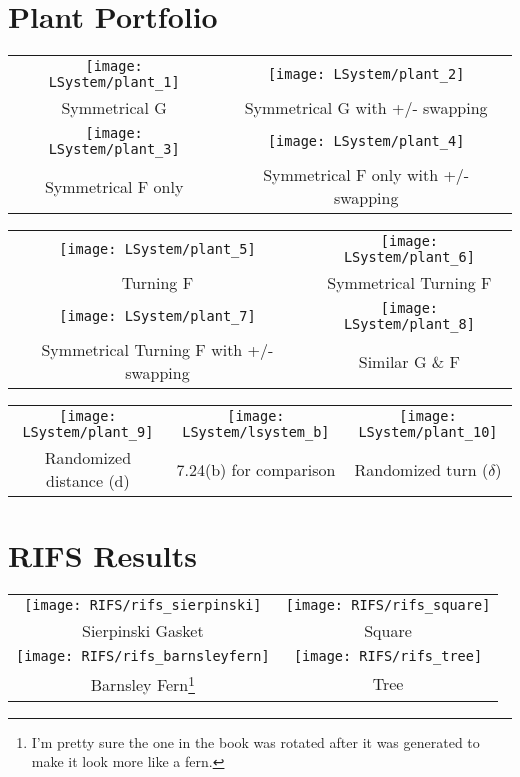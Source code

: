 \section{Plant Portfolio} \label{plant_portfolio}
\begin{tabular}{ c c }
\texttt{[image: LSystem/plant\_1]} &
\texttt{[image: LSystem/plant\_2]} \\
Symmetrical G & Symmetrical G with +/- swapping \\

\texttt{[image: LSystem/plant\_3]} &
\texttt{[image: LSystem/plant\_4]} \\
Symmetrical F only & Symmetrical F only with +/- swapping
\end{tabular}

\begin{tabular}{ c c }
\texttt{[image: LSystem/plant\_5]} &
\texttt{[image: LSystem/plant\_6]} \\
Turning F & Symmetrical Turning F \\

\texttt{[image: LSystem/plant\_7]} &
\texttt{[image: LSystem/plant\_8]} \\
Symmetrical Turning F with +/- swapping & Similar G \& F
\end{tabular}

\begin{tabular}{ c c c }
\texttt{[image: LSystem/plant\_9]} &
\texttt{[image: LSystem/lsystem\_b]} &
\texttt{[image: LSystem/plant\_10]} \\
Randomized distance (d) & 7.24(b) for comparison & Randomized turn ($\delta$)
\end{tabular}

\newpage
\section{RIFS Results} \label{RIFS_results}
\begin{tabular}{ c c }
\texttt{[image: RIFS/rifs\_sierpinski]} &
\texttt{[image: RIFS/rifs\_square]} \\
Sierpinski Gasket & Square \\
\texttt{[image: RIFS/rifs\_barnsleyfern]} &
\texttt{[image: RIFS/rifs\_tree]} \\
Barnsley Fern\footnote{I'm pretty sure the one in the book was rotated after it was generated to make it look more like a fern.} & Tree
\end{tabular}